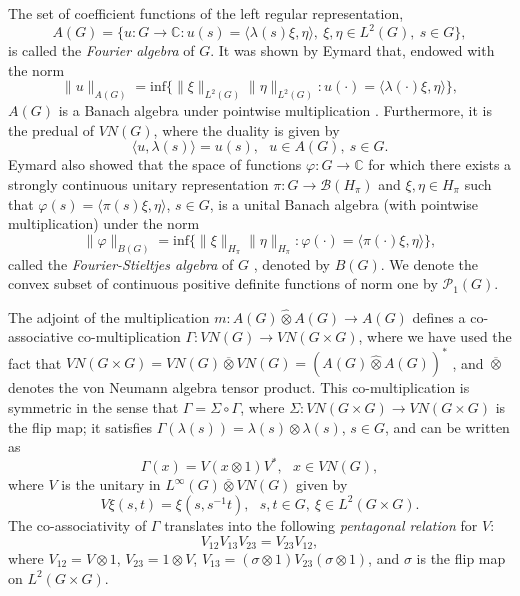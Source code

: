 \documentclass[preprint,12pt]{elsarticle}
\newcommand{\mc}[1]{\mathcal{#1}}
\newcommand{\e}[1]{\emph{#1}}
\newcommand{\la}{\langle}
\newcommand{\ra}{\rangle}
\newcommand{\LG}{VN(G)}
\newcommand{\LT}{L^2(G)}
\newcommand{\LI}{L^{\infty}(G)}
\newcommand{\vphi}{\varphi}
\newcommand{\lm}{\lambda}
\newcommand{\Gam}{\Gamma}
\newcommand{\ten}{\otimes}
\newcommand{\oten}{\overline{\otimes}}
\newcommand{\hten}{\widehat{\otimes}}
\providecommand{\norm}[1]{\lVert#1\rVert}
\newcommand{\C}{\mathbb{C}}
\begin{document}
The set of coefficient functions of the left regular representation,
\begin{equation*}A(G)=\{u:G\rightarrow\C : u (s)=\la\lm(s)\xi,\eta\ra, \ \xi,\eta\in\LT, \ s\in G\},\end{equation*}
is called the \e{Fourier algebra} of $G$. It was shown by Eymard that, endowed with the norm
$$\norm{u}_{A(G)}=\text{inf}\{\norm{\xi}_{\LT}\norm{\eta}_{\LT} : u(\cdot)=\la\lm(\cdot)\xi,\eta\ra\},$$
$A(G)$ is a Banach algebra under pointwise multiplication \cite[Proposition 3.4]{E}. Furthermore, it is the predual of $\LG$, where the duality is given by
\begin{equation*}\la u,\lm(s)\ra=u(s),\ \ \ u\in A(G), \ s\in G.\end{equation*}
Eymard also showed that the space of functions $\vphi:G\rightarrow\C$ for which there exists a strongly continuous unitary representation $\pi:G\rightarrow\mc{B}(H_\pi)$ and $\xi,\eta\in H_\pi$ such that $\vphi(s)=\la\pi(s)\xi,\eta\ra$, $s\in G$, is a unital Banach algebra (with pointwise multiplication) under the norm
$$\norm{\vphi}_{B(G)}=\text{inf}\{\norm{\xi}_{H_\pi}\norm{\eta}_{H_\pi} : \vphi(\cdot)=\la\pi(\cdot)\xi,\eta\ra\},$$
called the  \e{Fourier-Stieltjes algebra} of $G$ \cite[Proposition 2.16]{E}, denoted by $B(G)$. We denote the convex subset of continuous positive definite functions of norm one by $\mc{P}_1(G)$.

The adjoint of the multiplication $m:A(G)\hten A(G)\rightarrow A(G)$ defines a co-associative co-multiplication $\Gam:VN(G)\rightarrow VN(G\times G)$, where we have used the fact that $VN(G\times G)=VN(G)\oten VN(G)=(A(G)\hten A(G))^*$ \cite[Theorem 7.2.4]{ER}, and $\oten$ denotes the von Neumann algebra tensor product. This co-multiplication is symmetric in the sense that $\Gam=\Sigma\circ\Gam$, where $\Sigma:VN(G\times G)\rightarrow VN(G\times G)$ is the flip map; it satisfies $\Gam(\lm(s))=\lm(s)\ten\lm(s)$, $s\in G$, and can be written as
$$\Gam(x)=V(x\ten 1)V^*, \ \ \ x\in VN(G),$$
where $V$ is the unitary in $\LI\oten VN(G)$ given by
$$V\xi(s,t)=\xi(s,s^{-1}t), \ \ \ s,t\in G, \ \xi\in L^2(G\times G).$$
The co-associativity of $\Gam$ translates into the following \e{pentagonal relation} for $V$:
\begin{equation}\label{e:pentagonal} V_{12}V_{13}V_{23}=V_{23}V_{12},\end{equation}
where $V_{12}=V\ten 1$, $V_{23}=1\ten V$, $V_{13}=(\sigma\ten 1)V_{23}(\sigma\ten 1)$, and $\sigma$ is the flip map on $L^2(G\times G)$.
\end{document}
